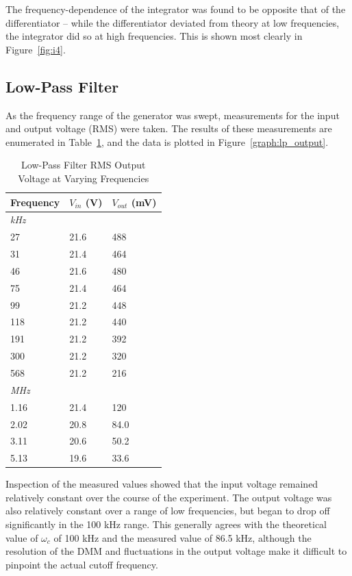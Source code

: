 \documentclass[twocolumn,english]{IEEEtran}
\theoremstyle{plain}
\theoremstyle{plain}
\begin{document}
	The frequency-dependence of the integrator was found to be opposite that of the differentiator -- while the differentiator deviated from theory at low frequencies, the integrator did so at high frequencies. This is shown most clearly in Figure~\ref{fig:i4}.

	\subsection{Low-Pass Filter}

		As the frequency range of the generator was swept, measurements for the input and output voltage (RMS) were taken. The results of these measurements are enumerated in Table~\ref{tb:lp_output}, and the data is plotted in Figure~\ref{graph:lp_output}.
		\begin{table}[H]
			\caption{Low-Pass Filter RMS Output Voltage at Varying Frequencies}
			\label{tb:lp_output}
			\centering
		\begin{tabular}{@{}lll@{}}
		\toprule
		Frequency 	& $V_{in}$ (V) 	& $V_{out}$ (mV) \\
		\midrule
		\textit{kHz}&     		&    	\\
		27   		& 21.6 		& 488  	\\
		31   		& 21.4 		& 464  	\\
		46   		& 21.6 		& 480  	\\
		75   		& 21.4 		& 464  	\\
		99   		& 21.2 		& 448  	\\
		118  		& 21.2 		& 440  	\\
		191  		& 21.2 		& 392  	\\
		300  		& 21.2 		& 320  	\\
		568  		& 21.2 		& 216  	\\
		\midrule
		\textit{MHz}&      		&      	\\
		1.16 		& 21.4 		& 120  	\\
		2.02 		& 20.8 		& 84.0	\\
		3.11 		& 20.6 		& 50.2	\\
		5.13 		& 19.6 		& 33.6 	\\
		\bottomrule
		\end{tabular}
		\end{table}

		Inspection of the measured values showed that the input voltage remained relatively constant over the course of the experiment. The output voltage was also relatively constant over a range of low frequencies, but began to drop off significantly in the 100 kHz range. This generally agrees with the theoretical value of $\omega_c$ of 100 kHz and the measured value of 86.5 kHz, although the resolution of the DMM and fluctuations in the output voltage make it difficult to pinpoint the actual cutoff frequency.
\end{document}
